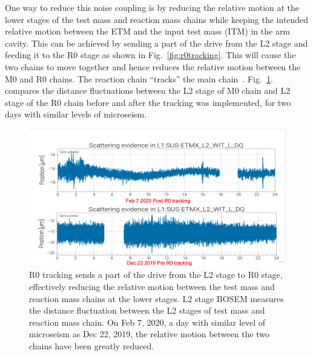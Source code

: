 \documentclass[12pt]{iopart}
\begin{document}
One way to reduce this noise coupling is by reducing the relative motion at the lower stages of the test mass and reaction mass chains while keeping the intended relative motion between the ETM and the input test mass (ITM) in the arm cavity. This can be achieved by sending a part of the drive from the L2 stage and feeding it to the R0 stage as shown in Fig.~\ref{fig:r0tracking}. This will cause the two chains to move together and hence reduces the relative motion between the M0 and R0 chains. The reaction chain ``tracks'' the main chain~\cite{alog_robert}. Fig.~\ref{fig:l2_comparison}. compares the distance fluctuations between the L2 stage of M0 chain and L2 stage of the R0 chain before and after the tracking was implemented, for two days with similar levels of microseism.

\begin{figure}[h]
    \centering
    \includegraphics[width=12cm]{feb7_dec22l2.png}
    \caption{R0 tracking sends a part of the drive from the L2 stage to R0 stage, effectively reducing the relative motion between the test mass and reaction mass chains at the lower stages. L2 stage BOSEM measures the distance fluctuation between the L2 stages of test mass and reaction mass chain. On Feb 7, 2020, a day with similar level of microseism as Dec 22, 2019, the relative motion between the two chains have been greatly reduced.}
    \label{fig:l2_comparison}
\end{figure}
\end{document}
